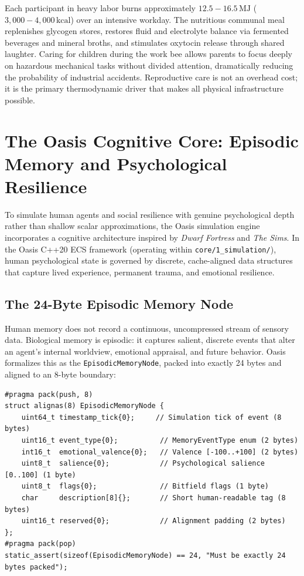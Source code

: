 Each participant in heavy labor burns approximately $12.5 - 16.5\,\mathrm{MJ}$ ($3{,}000 - 4{,}000\,\mathrm{kcal}$) over an intensive workday. The nutritious communal meal replenishes glycogen stores, restores fluid and electrolyte balance via fermented beverages and mineral broths, and stimulates oxytocin release through shared laughter. Caring for children during the work bee allows parents to focus deeply on hazardous mechanical tasks without divided attention, dramatically reducing the probability of industrial accidents. Reproductive care is not an overhead cost; it is the primary thermodynamic driver that makes all physical infrastructure possible.

\section{The Oasis Cognitive Core: Episodic Memory and Psychological Resilience}
\label{sec:oasis_cognitive_core}

To simulate human agents and social resilience with genuine psychological depth rather than shallow scalar approximations, the Oasis simulation engine incorporates a cognitive architecture inspired by \textit{Dwarf Fortress} and \textit{The Sims}. In the Oasis C++20 ECS framework (operating within \texttt{core/1\_simulation/}), human psychological state is governed by discrete, cache-aligned data structures that capture lived experience, permanent trauma, and emotional resilience.

\subsection{The 24-Byte Episodic Memory Node}
Human memory does not record a continuous, uncompressed stream of sensory data. Biological memory is episodic: it captures salient, discrete events that alter an agent's internal worldview, emotional appraisal, and future behavior. Oasis formalizes this as the \texttt{EpisodicMemoryNode}, packed into exactly 24 bytes and aligned to an 8-byte boundary:
\begin{verbatim}
#pragma pack(push, 8)
struct alignas(8) EpisodicMemoryNode {
    uint64_t timestamp_tick{0};     // Simulation tick of event (8 bytes)
    uint16_t event_type{0};          // MemoryEventType enum (2 bytes)
    int16_t  emotional_valence{0};   // Valence [-100..+100] (2 bytes)
    uint8_t  salience{0};            // Psychological salience [0..100] (1 byte)
    uint8_t  flags{0};               // Bitfield flags (1 byte)
    char     description[8]{};       // Short human-readable tag (8 bytes)
    uint16_t reserved{0};            // Alignment padding (2 bytes)
};
#pragma pack(pop)
static_assert(sizeof(EpisodicMemoryNode) == 24, "Must be exactly 24 bytes packed");
\end{verbatim}

